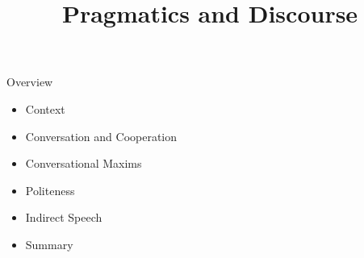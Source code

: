 \documentclass{beamer}
\title{Pragmatics and Discourse}
\begin{document}
\maketitle

%


\begin{frame}{Overview}

\begin{itemize}
\item Context
\item Conversation and Cooperation
\item Conversational Maxims
\item Politeness
\item Indirect Speech
\item Summary

\end{itemize}

\end{frame}


\end{document}
